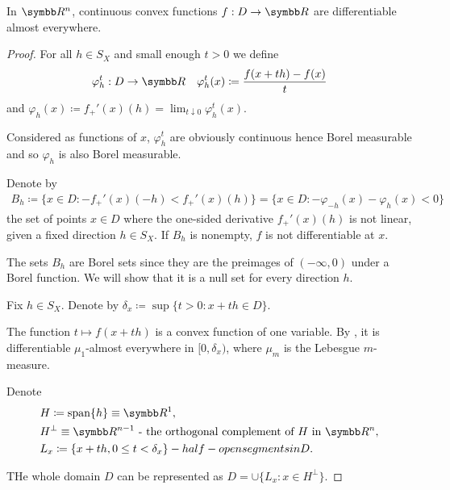 \begin{theorem}\label{thm:rn_continuous_convex_frechet_almost_everywhere}\cite[exercise 1.17]{Phelps1993}
  In \( \BB{R}^n \), continuous convex functions \( f: D \to \BB{R} \) are differentiable almost everywhere.
\end{theorem}
\begin{proof}
  For all \( h \in S_X \) and small enough \( t > 0 \) we define
  \begin{align*}
    &\varphi_h^t: D \to \BB{R}
    &\varphi_h^t(x) \coloneqq \frac {f(x + th) - f(x)} t
  \end{align*}
  and \( \varphi_h(x) \coloneqq f_+'(x)(h) = \lim_{t \downarrow 0} \varphi_h^t(x) \).

  Considered as functions of \( x \), \( \varphi_h^t \) are obviously continuous hence Borel measurable and so \( \varphi_h \) is also Borel measurable.

  Denote by
  \begin{align*}
    B_h
    \coloneqq
    \{ x \in D \colon -f_+'(x)(-h) < f_+'(x)(h) \}
    =
    \{ x \in D \colon -\varphi_{-h}(x) - \varphi_h(x) < 0 \}
  \end{align*}
  the set of points \( x \in D \) where the one-sided derivative \( f_+'(x)(h) \) is not linear, given a fixed direction \( h \in S_X \). If \( B_h \) is nonempty, \( f \) is not differentiable at \( x \).

  The sets \( B_h \) are Borel sets since they are the preimages of \( (-\infty, 0) \) under a Borel function. We will show that it is a null set for every direction \( h \).

  Fix \( h \in S_X \). Denote by \( \delta_x \coloneqq \sup \{ t > 0 \colon x + th \in D \} \).

  The function \( t \mapsto f(x + th) \) is a convex function of one variable. By \cite[theorem 1.16]{Phelps1993}, it is differentiable \( \mu_1 \)-almost everywhere in \( [0, \delta_x) \), where \( \mu_m \) is the Lebesgue \( m \)-measure.

  Denote
  \begin{align*}
    &H \coloneqq \Span\{ h \} \equiv \BB{R}^1,
    \\
    &H^\perp \equiv \BB{R}^{n-1} \text{ - the orthogonal complement of \( H \) in \( \BB{R}^n \)},
    \\
    &L_x \coloneqq \{ x + th, 0 \leq t < \delta_x \} - half-open segments in D.
  \end{align*}

  THe whole domain \( D \) can be represented as \( D = \cup \{ L_x \colon x \in H^\perp \} \).


\end{proof}
